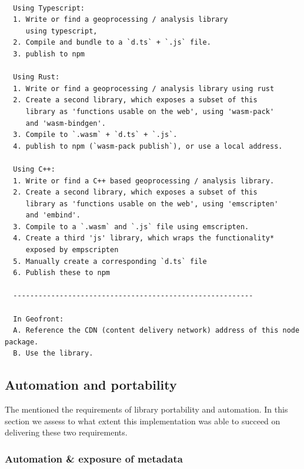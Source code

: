 \begin{lstlisting}
  
  Using Typescript: 
  1. Write or find a geoprocessing / analysis library 
     using typescript, 
  2. Compile and bundle to a `d.ts` + `.js` file.
  3. publish to npm 

  Using Rust: 
  1. Write or find a geoprocessing / analysis library using rust
  2. Create a second library, which exposes a subset of this 
     library as 'functions usable on the web', using 'wasm-pack' 
     and 'wasm-bindgen'.
  3. Compile to `.wasm` + `d.ts` + `.js`.
  4. publish to npm (`wasm-pack publish`), or use a local address.
  
  Using C++: 
  1. Write or find a C++ based geoprocessing / analysis library. 
  2. Create a second library, which exposes a subset of this 
     library as 'functions usable on the web', using 'emscripten' 
     and 'embind'.
  3. Compile to a `.wasm` and `.js` file using emscripten.
  4. Create a third 'js' library, which wraps the functionality* 
     exposed by empscripten
  5. Manually create a corresponding `d.ts` file
  6. Publish these to npm 

  ---------------------------------------------------------

  In Geofront: 
  A. Reference the CDN (content delivery network) address of this node package. 
  B. Use the library.

\end{lstlisting}


\subsection{Automation and portability}

The  mentioned the requirements of library portability and automation. 
In this section we assess to what extent this implementation was able to succeed on delivering these two requirements. 

\subsubsection*{Automation \& exposure of metadata}

